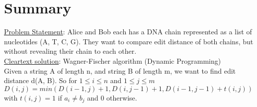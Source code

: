 
\clearpage
{}

%
\setcounter{section}{0} %

\section{Summary}
\underline{Problem Statement}: Alice and Bob each has a DNA chain represented as a list of nucleotides (A, T, C, G). They want to compare edit distance of both chains, but without revealing their chain to each other.\\

\underline{Cleartext solution}: Wagner-Fischer algorithm (Dynamic Programming) \\

Given a string A of length n, and string B of length m, we want to find edit distance d(A, B). So for $1 \le i \le n$ and $1 \le j \le m$ \\

$D(i, j) = min ( D(i-1, j) + 1, D(i, j-1) + 1, D(i-1, j-1) + t(i, j))$ \\

with $t(i, j) = 1$ if $a_i \neq b_j$ and $0$ otherwise.\\

